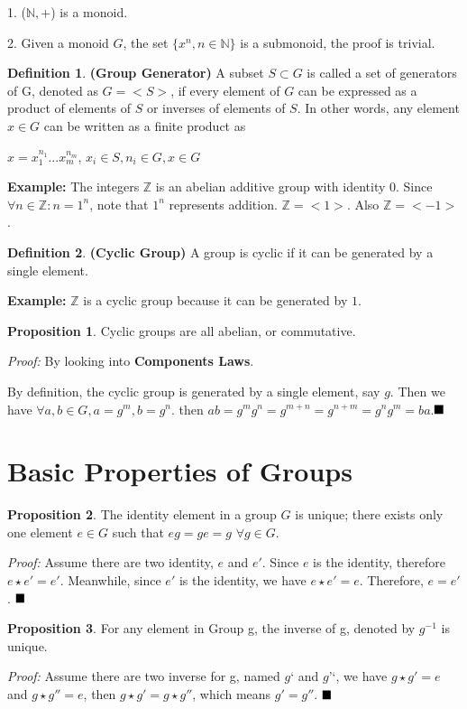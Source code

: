 \documentclass[12pt,openany]{book}
\theoremstyle{definition}
\newtheorem{defi}{Definition}[section]
\newtheorem{proposition}{Proposition}[section]
\theoremstyle{definition}
\begin{document}
1. ($\mathbb{N},+$) is a monoid.

2. Given a monoid $G$, the set ${\{x^{n}, n \in \mathbb{N} \}}$ is a submonoid, the proof is trivial.
\begin{defi}
\noindent\textbf{(Group Generator)} A subset $S \subset G$ is called a set of generators of G, denoted as $G=<S>$, if every element of $G$ can be expressed as a product of elements of $S$ or inverses of elements of $S$. In other words, any element $x \in G$ can be written as a finite product as 

$x = x_{1}^{n_{1}}...x_{m}^{n_{m}}$, $x_{i} \in S, n_{i} \in G, x \in G$

\noindent\textbf{Example:} The integers $\mathbb{Z}$ is an abelian additive group with identity 0. Since $\forall n \in \mathbb{Z}: n=1^{n}$, note that $1^{n}$ represents addition. $\mathbb{Z}=<1>$. Also $\mathbb{Z}=<-1>$.
\end{defi}
\begin{defi}
\noindent\textbf{(Cyclic Group)} A group is cyclic if it can be generated by a single element.

\noindent\textbf{Example:} $\mathbb{Z}$ is a cyclic group because it can be generated by $1$.
\end{defi}
\begin{proposition}
Cyclic groups are all abelian, or commutative.
\end{proposition}
\textit{Proof:} By looking into \textbf{Components Laws}. 

By definition, the cyclic group is generated by a single element, say $g$. Then we have $\forall a, b \in G, a=g^{m}, b=g^{n}$. then $ab = g^{m}g^{n} = g^{m+n} = g^{n+m} = g^ng^m = ba$.$\hfill \blacksquare$

\section{Basic Properties of Groups}

\begin{proposition}
The identity element in a group $G$ is unique; there exists only one element $e \in G$ such that $eg = ge = g $ $\forall g \in G$.
\end{proposition}
\textit{Proof:} Assume there are two identity, $e $ and $ e'$. Since $e$ is the identity, therefore $e\star e' = e'$. Meanwhile, since $e'$ is the identity, we have $e \star e' = e$. Therefore, $e = e'$. $\hfill\blacksquare$

\begin{proposition}
For any element in Group g, the inverse of g, denoted by $g^{-1}$ is unique.
\end{proposition}
\textit{Proof:} Assume there are two inverse for g, named $g‘$ and $g’‘$, we have $g \star g' = e$ and $g \star g'' = e$, then $g \star g' = g \star g''$, which means $g' = g''$. $\hfill\blacksquare$
\end{document}
